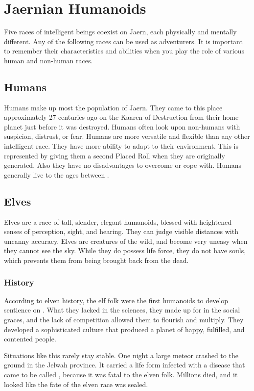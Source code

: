 \chapter{Jaernian Humanoids}
\label{ch:jaern-humanoids}
\setlength{\columnsep}{\defcolwidth}\begin{multicols*}{2}
Five races of intelligent beings coexist on Jaern,
each physically and mentally different. Any of the following
races can be used as adventurers. It is important to remember
their characteristics and abilities when you play the role of
various human and non-human races.
\section{Humans}
Humans make up most the population of Jaern.
They came to this place approximately 27 centuries ago on the Kaaren of Destruction from their home planet  just before it was destroyed. Humans often look upon non-humans with suspicion, distrust, or fear. Humans are more versatile and flexible than any other intelligent race. They have more ability to adapt to their environment. This is represented by giving them a second Placed Roll when they are originally generated. Also they have no disadvantages to overcome or cope with. Humans generally live to the ages between .
\makeline
\section{Elves}
Elves are a race of tall, slender, elegant humanoids, blessed with heightened senses of perception, sight, and hearing. They can judge visible distances with uncanny accuracy. Elves are creatures of the wild, and become very uneasy when they cannot see the sky. While they do possess life force, they do not have souls, which prevents them from being brought back from the dead.
\subsection{History}
According to elven history, the elf folk were the first humanoids to develop sentience on . What they lacked in the sciences, they made up for in the social graces, and the lack of competition allowed them to flourish and multiply. They developed a sophisticated culture that produced a planet of happy, fulfilled, and contented people.

Situations like this rarely stay stable. One night a large meteor crashed to the ground in the Jelwah province. It carried a life form infected with a disease that came to be
called , because it was fatal to the elven folk. Millions died, and it looked like the fate of the elven race was sealed.


\end{multicols*}
